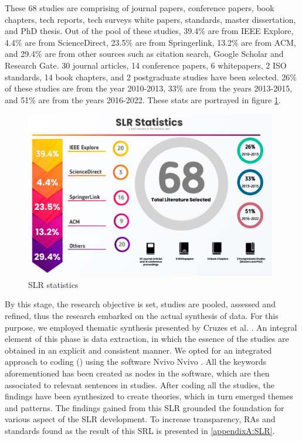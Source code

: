 \documentclass[review]{elsarticle}
\begin{document}
These 68 studies are comprising of journal papers, conference papers, book chapters, tech reports, tech surveys white papers, standards, master dissertation, and PhD thesis. Out of the pool of these studies, 39.4\% are from IEEE Explore, 4.4\% are from ScienceDirect, 23.5\% are from Springerlink, 13.2\% are from ACM, and 29.4\% are from other sources such as citation search, Google Scholar and Research Gate. 30 journal articles, 14 conference papers, 6 whitepapers, 2 ISO standards, 14 book chapters, and 2 postgraduate studies have been selected. 26\% of these studies are from the year 2010-2013, 33\% are from the years 2013-2015, and 51\% are from the years 2016-2022. These stats are portrayed in figure \ref{fig:SLRStats}.

\begin{figure}[h!]
    \centering
    \includegraphics[width=11cm]{databases-statitistic.jpg}
    \caption{SLR statistics}
    \label{fig:SLRStats}
\end{figure}


By this stage, the research objective is set, studies are pooled, assessed and refined, thus the research embarked on the actual synthesis of data. For this purpose, we employed thematic synthesis presented by Cruzes et al. \cite{cruzes2011recommended}. An integral element of this phase is data extraction, in which the essence of the studies are obtained in an explicit and consistent manner. We opted for an integrated approach to coding (\cite{lofland1971analyzing}) using the software Nvivo Nvivo \cite{nvivo}. All the keywords aforementioned has been created as nodes in the software, which are then associated to relevant sentences in studies. After coding all the studies, the findings have been synthesized to create theories, which in turn emerged themes and patterns. The findings gained from this SLR grounded the foundation for various aspect of the SLR development. To increase transparency, RAs and standards found as the result of this SRL is presented in \ref{appendixA:SLR}. 
\end{document}
